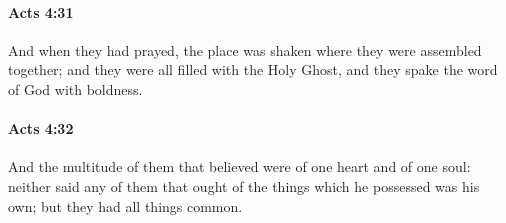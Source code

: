 		\paragraph{Acts 4:31} %
			\label{ACTS-4-31}

			And when they had prayed, the place was shaken where they were assembled together; and they were all filled with the Holy Ghost, and they spake the word of God with boldness.

			\begin{framed}
			\scriptsize
				\begin{compactdesc}
					\item[SBLG] 
				\end{compactdesc}
			\end{framed}

		\paragraph{Acts 4:32} %
			\label{ACTS-4-32}

			And the multitude of them that believed were of one heart and of one soul: neither said any of them that ought of the things which he possessed was his own; but they had all things common.

